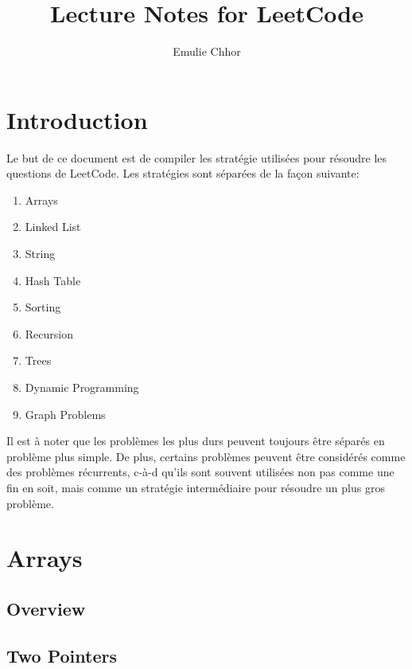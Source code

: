 \documentclass{article}
\begin{document}
\title{Lecture Notes for LeetCode}
\author{Emulie Chhor}
\maketitle

\section*{Introduction}

Le but de ce document est de compiler les stratégie utilisées pour
résoudre les questions de LeetCode. Les stratégies sont séparées de la
façon suivante:

    \begin{enumerate}
	\item Arrays
	\item Linked List
	\item String
	\item Hash Table
	\item Sorting
	\item Recursion
	\item Trees
	\item Dynamic Programming
	\item Graph Problems
    \end{enumerate}

Il est à noter que les problèmes les plus durs peuvent toujours être
séparés en problème plus simple. De plus, certains problèmes peuvent
être considérés comme des problèmes récurrents, c-à-d qu'ils sont
souvent utilisées non pas comme une fin en soit, mais comme un stratégie
intermédiaire pour résoudre un plus gros problème.

\newtheorem{strategy}{Strategy}[subsection]
\newtheorem*{remark}{Remarque}
\newtheorem*{problem}{Problème}
\newtheorem*{intuition}{Intuition}

\section{Arrays}%
\label{sec:Arrays}

\subsection*{Overview}%
\label{sub:Overview}

\subsection{Two Pointers}%
\label{sub:Two Pointers}
\end{document}

